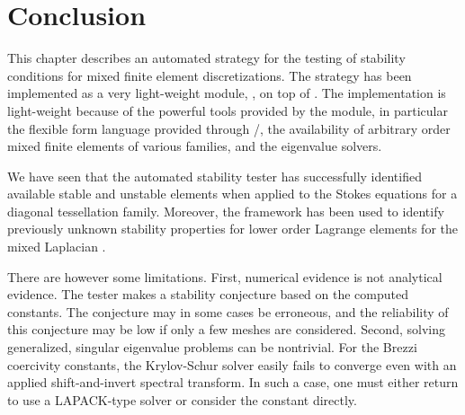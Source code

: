 \section{Conclusion}
\label{rognes:sec:conclusion}

This chapter describes an automated strategy for the testing of stability
conditions for mixed finite element discretizations. The strategy has
been implemented as a very light-weight \rognespython{} module,
\rognesascot{}, on top of \pydolfin{}. The implementation is
light-weight because of the powerful tools provided by the \pydolfin{}
module, in particular the flexible form language provided through
\ufl{}/\ffc{}, the availability of arbitrary order mixed finite
elements of various families, and the \slepc{} eigenvalue solvers.

We have seen that the automated stability tester has successfully
identified available stable and unstable elements when applied to the
Stokes equations for a diagonal tessellation family. Moreover, the
framework has been used to identify previously unknown stability
properties for lower order Lagrange elements for the mixed
Laplacian \citep{ArnoldRognes2009}.

There are however some limitations. First, numerical evidence is not
analytical evidence. The tester makes a stability conjecture based on
the computed constants. The conjecture may in some cases be erroneous,
and the reliability of this conjecture may be low if only a few meshes
are considered. Second, solving generalized, singular eigenvalue
problems can be nontrivial. For the Brezzi coercivity constants, the
Krylov-Schur solver easily fails to converge even with an applied
shift-and-invert spectral transform. In such a case, one must either
return to use a LAPACK-type solver or consider the \babuska{} constant
directly.

